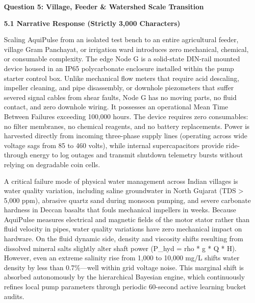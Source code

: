 \documentclass[10pt,a4paper]{article}
\begin{document}
\newpage

{\large \textbf{\color{primary}Question 5: Village, Feeder \& Watershed Scale Transition}}
\vspace{0.1em}

{\small \textbf{\color{secondary}5.1 Narrative Response (Strictly 3,000 Characters)}}

Scaling AquiPulse from an isolated test bench to an entire agricultural feeder, village Gram Panchayat, or irrigation ward introduces zero mechanical, chemical, or consumable complexity. The edge Node G is a solid-state DIN-rail mounted device housed in an IP65 polycarbonate enclosure installed within the pump starter control box. Unlike mechanical flow meters that require acid descaling, impeller cleaning, and pipe disassembly, or downhole piezometers that suffer severed signal cables from shear faults, Node G has no moving parts, no fluid contact, and zero downhole wiring. It possesses an operational Mean Time Between Failures exceeding 100,000 hours. The device requires zero consumables: no filter membranes, no chemical reagents, and no battery replacements. Power is harvested directly from incoming three-phase supply lines (operating across wide voltage sags from 85 to 460 volts), while internal supercapacitors provide ride-through energy to log outages and transmit shutdown telemetry bursts without relying on degradable coin cells.

A critical failure mode of physical water management across Indian villages is water quality variation, including saline groundwater in North Gujarat (TDS > 5,000 ppm), abrasive quartz sand during monsoon pumping, and severe carbonate hardness in Deccan basalts that fouls mechanical impellers in weeks. Because AquiPulse measures electrical and magnetic fields of the motor stator rather than fluid velocity in pipes, water quality variations have zero mechanical impact on hardware. On the fluid dynamic side, density and viscosity shifts resulting from dissolved mineral salts slightly alter shaft power (P_hyd = rho * g * Q * H). However, even an extreme salinity rise from 1,000 to 10,000 mg/L shifts water density by less than 0.7\%—well within grid voltage noise. This marginal shift is absorbed autonomously by the hierarchical Bayesian engine, which continuously refines local pump parameters through periodic 60-second active learning bucket audits.
\end{document}
